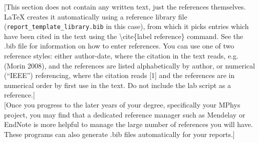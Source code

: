 \documentclass[11pt]{article} %
\begin{document}
{\color{blue} [This section does not contain any written text, just the references themselves.  LaTeX creates it
automatically using a reference library file ({\tt report\_template\_library.bib} in this case), from which it picks entries which have
been cited in the text using the \textbackslash cite\{label reference\} command. See the .bib file for information on how to enter references. You can use one of two reference styles: either author-date, where the citation in the text reads, e.g. (Morin 2008), 
and the references are listed alphabetically by author, or numerical (“IEEE”) referencing, where the citation reads [1] and the references are in numerical order by first use in the text. Do not include the lab script as a reference.]\\

 [Once you progress to the later years of your degree, specifically your MPhys project, you may find that a dedicated reference manager such as Mendelay or EndNote is more helpful to manage the large number of references you will have. These programs can also generate .bib files automatically for your reports.]}\\
\end{document}
